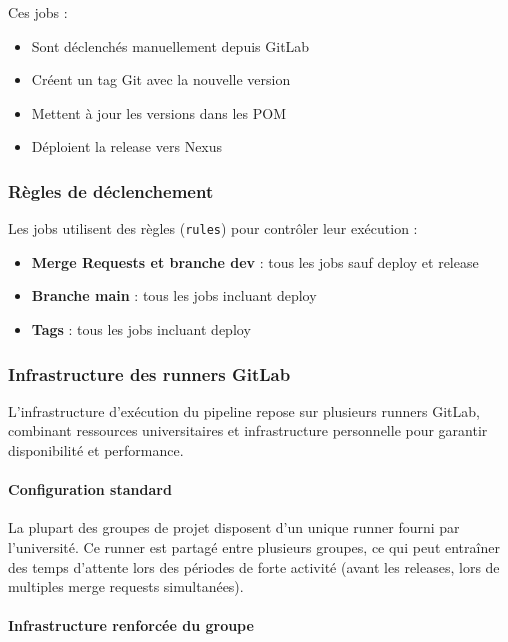 Ces jobs :
\begin{itemize}
    \item Sont déclenchés manuellement depuis GitLab
    \item Créent un tag Git avec la nouvelle version
    \item Mettent à jour les versions dans les POM
    \item Déploient la release vers Nexus
\end{itemize}

\subsubsection{Règles de déclenchement}

Les jobs utilisent des règles (\texttt{rules}) pour contrôler leur exécution :
\begin{itemize}
    \item \textbf{Merge Requests et branche dev} : tous les jobs sauf deploy et release
    \item \textbf{Branche main} : tous les jobs incluant deploy
    \item \textbf{Tags} : tous les jobs incluant deploy
\end{itemize}

\subsubsection{Infrastructure des runners GitLab}

L'infrastructure d'exécution du pipeline repose sur plusieurs runners GitLab, combinant ressources universitaires et infrastructure personnelle pour garantir disponibilité et performance.

\paragraph{Configuration standard}

La plupart des groupes de projet disposent d'un unique runner fourni par l'université. Ce runner est partagé entre plusieurs groupes, ce qui peut entraîner des temps d'attente lors des périodes de forte activité (avant les releases, lors de multiples merge requests simultanées).

\paragraph{Infrastructure renforcée du groupe}

